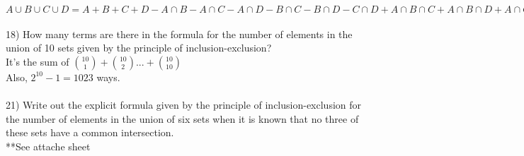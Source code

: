 \documentclass{article}
\begin{document}
\begin{flushleft}
$A \cup B \cup C \cup D = A + B + C + D - A\cap B - A\cap C - A\cap D - B\cap C - B\cap D - C\cap D + A\cap B \cap C + A\cap B \cap D +  A\cap C \cap D +  B\cap C \cap D - A \cap B \cap C \cap D = 507 + 292 + 312 +  344 - 14 -213 -211 -43 + 0 = 974$ \\
~\\
\setlength\parindent{0pt}18) How many terms are there in the formula for the number of elements in the union of 10 sets given by the principle of inclusion-exclusion? \\
\setlength\parindent{24pt} It's the sum of ${10 \choose 1} + {10 \choose 2} . . . + {10 \choose 10}$ \\
\setlength\parindent{24pt} Also, $2^{10} - 1 = 1023$ ways. \\
~\\
\setlength\parindent{0pt}21) Write out the explicit formula given by the principle of inclusion-exclusion for the number of elements in the union of six sets when it is known that no three of these sets have a common intersection. \\
**See attache sheet

\end{flushleft}
\end{document}
